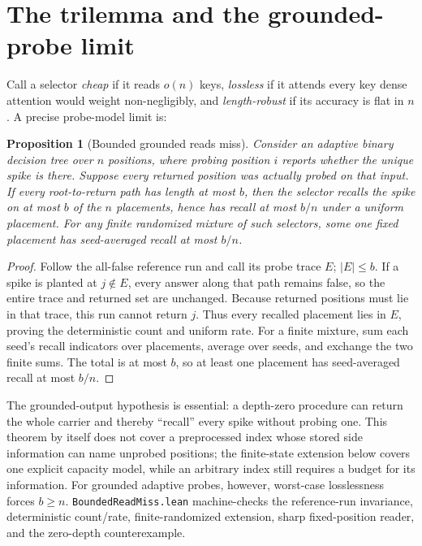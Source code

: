 \documentclass[11pt]{article}
\numberwithin{equation}{section}
\newtheorem{proposition}{Proposition}
\begin{document}
\section{The trilemma and the grounded-probe limit}\label{sec:trilemma}

Call a selector \emph{cheap} if it reads $o(n)$ keys, \emph{lossless} if it attends every key dense attention
would weight non-negligibly, and \emph{length-robust} if its accuracy is flat in $n$. A precise probe-model
limit is:

\begin{proposition}[Bounded grounded reads miss]\label{prop:impossible}
Consider an adaptive binary decision tree over $n$ positions, where probing position $i$ reports whether the
unique spike is there. Suppose every returned position was actually probed on that input. If every
root-to-return path has length at most $b$, then the selector recalls the spike on at most $b$ of the $n$
placements, hence has recall at most $b/n$ under a uniform placement. For any finite randomized mixture of
such selectors, some one fixed placement has seed-averaged recall at most $b/n$.
\end{proposition}
\begin{proof}
Follow the all-false reference run and call its probe trace $E$; $|E|\le b$. If a spike is planted at
$j\notin E$, every answer along that path remains false, so the entire trace and returned set are unchanged.
Because returned positions must lie in that trace, this run cannot return $j$. Thus every recalled placement
lies in $E$, proving the deterministic count and uniform rate. For a finite mixture, sum each seed's recall
indicators over placements, average over seeds, and exchange the two finite sums. The total is at most $b$, so
at least one placement has seed-averaged recall at most $b/n$.
\end{proof}

The grounded-output hypothesis is essential: a depth-zero procedure can return the whole carrier and thereby
``recall'' every spike without probing one. This theorem by itself does not cover a preprocessed index whose
stored side information can name unprobed positions; the finite-state extension below covers one explicit
capacity model, while an arbitrary index still requires a budget for its information. For grounded adaptive probes, however, worst-case
losslessness forces $b\ge n$. \texttt{BoundedReadMiss.lean} machine-checks the reference-run invariance,
deterministic count/rate, finite-randomized extension, sharp fixed-position reader, and the zero-depth
counterexample.
\end{document}
